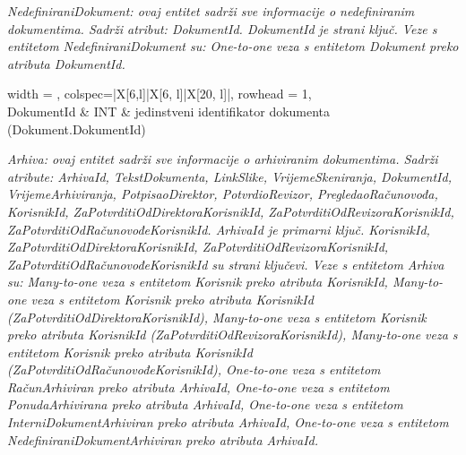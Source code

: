 				\textit{NedefiniraniDokument: ovaj entitet sadrži sve informacije o nedefiniranim dokumentima. Sadrži atribut: DokumentId. DokumentId je strani ključ.
				Veze s entitetom NedefiniraniDokument su: One-to-one veza s entitetom Dokument preko atributa DokumentId.}
				
				
				\begin{longtblr}[
					label=none,
					entry=none
					]{
						width = \textwidth,
						colspec={|X[6,l]|X[6, l]|X[20, l]|}, 
						rowhead = 1,
					} %
					\hline {}	 \\ \hline[3pt]
					DokumentId & INT	&  	jedinstveni identifikator dokumenta (Dokument.DokumentId)  	\\ \hline
				\end{longtblr}

				\textit{Arhiva: ovaj entitet sadrži sve informacije o arhiviranim dokumentima. Sadrži atribute: ArhivaId, TekstDokumenta, LinkSlike, VrijemeSkeniranja, DokumentId, VrijemeArhiviranja, PotpisaoDirektor, PotvrdioRevizor, PregledaoRačunovođa, KorisnikId, ZaPotvrditiOdDirektoraKorisnikId, ZaPotvrditiOdRevizoraKorisnikId, ZaPotvrditiOdRačunovođeKorisnikId. ArhivaId je primarni ključ. KorisnikId, ZaPotvrditiOdDirektoraKorisnikId, ZaPotvrditiOdRevizoraKorisnikId, ZaPotvrditiOdRačunovođeKorisnikId su strani ključevi.
				Veze s entitetom Arhiva su: Many-to-one veza s entitetom Korisnik preko atributa KorisnikId,
				Many-to-one veza s entitetom Korisnik preko atributa KorisnikId (ZaPotvrditiOdDirektoraKorisnikId),
				Many-to-one veza s entitetom Korisnik preko atributa KorisnikId (ZaPotvrditiOdRevizoraKorisnikId),
				Many-to-one veza s entitetom Korisnik preko atributa KorisnikId (ZaPotvrditiOdRačunovođeKorisnikId),
				One-to-one veza s entitetom RačunArhiviran preko atributa ArhivaId,
				One-to-one veza s entitetom PonudaArhivirana preko atributa ArhivaId,
				One-to-one veza s entitetom InterniDokumentArhiviran preko atributa ArhivaId,
				One-to-one veza s entitetom NedefiniraniDokumentArhiviran preko atributa ArhivaId.}

				
				
